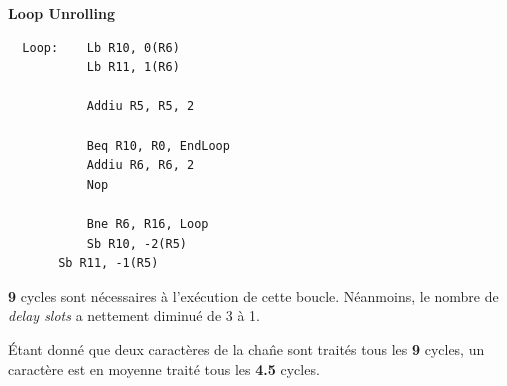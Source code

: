 \begin{correction}
  \textbf{Loop Unrolling}

  \begin{verbatim}
  Loop:    Lb R10, 0(R6)
           Lb R11, 1(R6)

           Addiu R5, R5, 2

           Beq R10, R0, EndLoop
           Addiu R6, R6, 2
           Nop

           Bne R6, R16, Loop
           Sb R10, -2(R5)
	   Sb R11, -1(R5)
  \end{verbatim}

  \textbf{9} cycles sont n\'ecessaires \`a l'ex\'ecution de cette boucle.
  N\'eanmoins, le nombre de \textit{delay slots} a nettement diminu\'e de
  3 \`a 1.

  \'Etant donn\'e que deux caract\`eres de la cha\^ne sont trait\'es tous
  les \textbf{9} cycles, un caract\`ere est en moyenne trait\'e tous les
  \textbf{4.5} cycles.

\end{correction}



